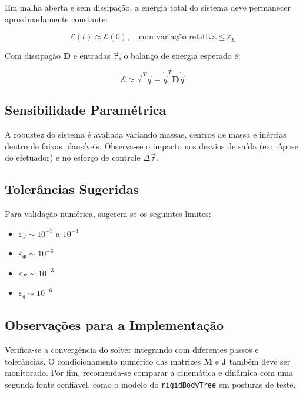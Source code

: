 Em malha aberta e sem dissipação, a energia total do sistema deve permanecer aproximadamente constante:

\begin{equation}
\mathcal{E}(t) \approx \mathcal{E}(0), \quad \text{com variação relativa} \leq \varepsilon_E
\label{eq:energia_constante}
\end{equation}

Com dissipação $ \mathbf{D} $ e entradas $ \vec{\tau} $, o balanço de energia esperado é:

\begin{equation}
\dot{\mathcal{E}} \approx \vec{\tau}^T \dot{\vec{q}} - \dot{\vec{q}}^T \mathbf{D} \dot{\vec{q}}
\label{eq:balanco_energia}
\end{equation}

\subsection{Sensibilidade Paramétrica}

A robustez do sistema é avaliada variando massas, centros de massa e inércias dentro de faixas plausíveis. Observa-se o impacto nos desvios de saída (ex: $ \Delta $pose do efetuador) e no esforço de controle $ \Delta \vec{\tau} $.

\subsection{Tolerâncias Sugeridas}

Para validação numérica, sugerem-se os seguintes limites:

\begin{itemize}
\item $ \varepsilon_J \sim 10^{-3} $ a $ 10^{-4} $
\item $ \varepsilon_\Phi \sim 10^{-6} $
\item $ \varepsilon_E \sim 10^{-3} $
\item $ \varepsilon_q \sim 10^{-6} $
\end{itemize}

\subsection{Observações para a Implementação}

Verifica-se a convergência do solver integrando com diferentes passos e tolerâncias. O condicionamento numérico das matrizes $ \mathbf{M} $ e $ \mathbf{J} $ também deve ser monitorado. Por fim, recomenda-se comparar a cinemática e dinâmica com uma segunda fonte confiável, como o modelo do \texttt{rigidBodyTree} em posturas de teste.
